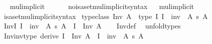 \begin{isabellebody}
\ \isamarkupfalse%
\ mul{\isacharunderscore}{\kern0pt}implicit\ \ {\isacharparenleft}{\kern0pt}\ {\isachardoublequoteopen}{\isacharasterisk}{\kern0pt}{\isachardoublequoteclose}\ {}{}{\isacharparenright}{\kern0pt}\ \isamarkupfalse%
\isanewline
\isanewline
{}\isamarkupfalse%
\ no{\isacharunderscore}{\kern0pt}isa{\isacharunderscore}{\kern0pt}set{\isacharunderscore}{\kern0pt}mul{\isacharunderscore}{\kern0pt}implicit{\isacharunderscore}{\kern0pt}syntax\isanewline
{}\ \isamarkupfalse%
\ mul{\isacharunderscore}{\kern0pt}implicit\ \ {\isacharparenleft}{\kern0pt}\ {\isachardoublequoteopen}{\isacharasterisk}{\kern0pt}{\isachardoublequoteclose}\ {}{}{\isacharparenright}{\kern0pt}\ \isamarkupfalse%
\isanewline
\isanewline
{}\isamarkupfalse%
\ isa{\isacharunderscore}{\kern0pt}set{\isacharunderscore}{\kern0pt}mul{\isacharunderscore}{\kern0pt}implicit{\isacharunderscore}{\kern0pt}syntax%
\isadelimdocument
%
\endisadelimdocument
%
\isatagdocument
%
\isamarkuptrue%
%
\endisatagdocument
{\isafolddocument}%
%
\isadelimdocument
%
\endisadelimdocument
{}\isamarkupfalse%
\ {\isacharbrackleft}{\kern0pt}typeclass{\isacharbrackright}{\kern0pt}{\isacharcolon}{\kern0pt}\ {\isachardoublequoteopen}Inv\ A\ {\isasymequiv}\ type\ {\isacharparenleft}{\kern0pt}{\isasymlambda}I{\isachardot}{\kern0pt}\ I\ {\isacharat}{\kern0pt}{\isacharat}{\kern0pt}\ inv\ {\isacharcolon}{\kern0pt}\ A\ {\isasymrightarrow}s\ A{\isacharparenright}{\kern0pt}{\isachardoublequoteclose}\isanewline
\isanewline
{}\isamarkupfalse%
\ InvI{\isacharcolon}{\kern0pt}\ {\isachardoublequoteopen}I\ {\isacharat}{\kern0pt}{\isacharat}{\kern0pt}\ inv\ {\isacharcolon}{\kern0pt}\ A\ {\isasymrightarrow}s\ A\ {\isasymLongrightarrow}\ I\ {\isacharcolon}{\kern0pt}\ Inv\ A{\isachardoublequoteclose}\isanewline
%
\isadelimproof
\ \ %
\endisadelimproof
%
\isatagproof
{}\isamarkupfalse%
\ Inv{\isacharunderscore}{\kern0pt}def\ \isamarkupfalse%
\ unfold{\isacharunderscore}{\kern0pt}types%
\endisatagproof
{\isafoldproof}%
%
\isadelimproof
\isanewline
%
\endisadelimproof
\isanewline
{}\isamarkupfalse%
\ Inv{\isacharunderscore}{\kern0pt}inv{\isacharunderscore}{\kern0pt}type\ {\isacharbrackleft}{\kern0pt}derive{\isacharbrackright}{\kern0pt}{\isacharcolon}{\kern0pt}\ {\isachardoublequoteopen}I\ {\isacharcolon}{\kern0pt}\ Inv\ A\ {\isasymLongrightarrow}\ I\ {\isacharat}{\kern0pt}{\isacharat}{\kern0pt}\ inv\ {\isacharcolon}{\kern0pt}\ A\ {\isasymrightarrow}s\ A{\isachardoublequoteclose}\isanewline

\end{isabellebody}

